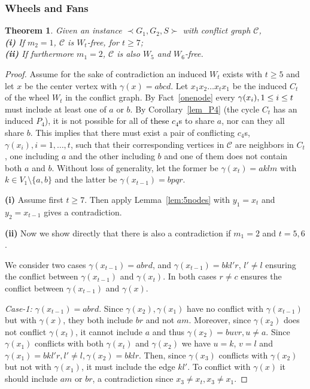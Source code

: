 \documentclass[final]{dmtcs-episciences}
\newtheorem{theorem}{Theorem}
\newcommand\mar[1]{\textcolor{black}{#1}}
\begin{document}
\subsubsection{Wheels and Fans}\label{subsub:wf}

\begin{theorem}
\label{lemW8} 
Given an instance $\prec G_1,G_2,S \succ$ with conflict graph $\mathcal{C}$,\\
\textbf{ (i)}
If $m_2=1$, $\mathcal{C}$ is $W_t$-free, for $t\geq 7$;\\
\textbf{ (ii)} If furthermore $m_1=2$, $\mathcal{C}$ is also $W_5$ and $W_6$-free. 
\end{theorem}

\begin{proof}
Assume for the sake of contradiction an induced $W_t$ exists with  $t\geq 5$ and 
let $x$ be the center vertex with $\gamma(x)=abcd$. Let $x_1x_2\ldots x_tx_1$
be the induced $C_t$ of the wheel $W_t$ in the conflict graph.
By Fact~\ref{onenode}
every $\mar{\gamma(x_i)}, 1\leq i\leq t$ must include at least one of 
$a$ or $b$. By Corollary~\ref{lem_P4} (the cycle $C_t$ has an induced $P_4$), it is not possible for all of \mar{these $c_4$s} to share 
$a$, nor can they all share $b$. This implies that there must exist 
a pair of conflicting $c_4$s, $\gamma(x_i), i=1, \ldots, t$, such that their corresponding vertices in $\mathcal{C}$ are neighbors in $C_t$, one including $a$ and the other including $b$ and one of them does not contain both $a$ and $b$. 
Without loss of generality, let the former be $\gamma(x_t)=aklm$  with $k \in V_1 \setminus \{a,b\}$ and the latter be $\gamma(x_{t-1})=bpqr$. 



\textbf{(i)}
Assume first $t\geq 7$. Then apply Lemma~\ref{lem:5nodes} with $y_1=x_t$ and $y_2=x_{t-1}$ gives a contradiction.

\textbf{(ii)} Now we show directly that there is also a contradiction if $m_1=2$ and $t=5,6$. 

We consider two cases $\gamma(x_{t-1})=abrd$,  and $\gamma(x_{t-1})=bkl'r$, $l'\neq l$ ensuring the conflict between $\gamma(x_{t-1})$ and $\gamma(x_{t})$. In both cases $r\neq c$ ensures the conflict between $\gamma(x_{t-1})$ and $\gamma(x)$.

 \emph{Case-1:} $\gamma(x_{t-1})=abrd$. Since $\gamma(x_2), \gamma(x_1)$ have no conflict with $\gamma(x_{t-1})$ but with $\gamma(x)$, they both include $br$ and not $am$. Moreover, since $\gamma(x_2)$ does not conflict  $\gamma(x_{t})$, it cannot include $a$ and thus $\gamma(x_2)=buvr, u\neq a$.  Since  $\gamma(x_1)$  conflicts with both $\gamma(x_t)$ and $\gamma(x_2)$ we have $u=k$, $v=l$ and $\gamma(x_1)=bkl'r, l'\neq l, \gamma(x_2)=bklr$. Then, since $\gamma(x_3)$ conflicts with $\gamma(x_2)$
but not with $\gamma(x_1)$, it must include the edge $kl'$. To conflict with $\gamma(x)$ it should include $am$ or $br$, a contradiction since $x_3\neq x_t, x_3\neq x_1$.



\end{proof}
\end{document}
